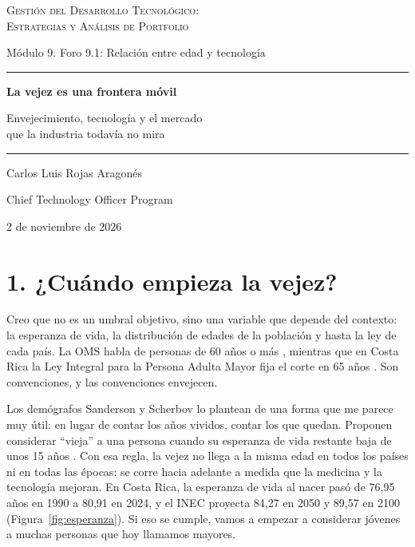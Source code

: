 \documentclass[11pt,letterpaper]{article}
\begin{document}
\begin{titlepage}
\centering
\vspace*{3.2cm}
{\large\scshape Gestión del Desarrollo Tecnológico:\\
Estrategias y Análisis de Portfolio\par}
\vspace{0.5cm}
{\normalsize Módulo 9. Foro 9.1: Relación entre edad y tecnología\par}
\vspace{2.6cm}
{\color{cEje}\rule{0.55\textwidth}{0.8pt}\par}
\vspace{0.7cm}
{\LARGE\bfseries La vejez es una frontera móvil\par}
\vspace{0.5cm}
{\large Envejecimiento, tecnología y el mercado\\
que la industria todavía no mira\par}
\vspace{0.7cm}
{\color{cEje}\rule{0.55\textwidth}{0.8pt}\par}
\vfill
{\large Carlos Luis Rojas Aragonés\par}
\vspace{0.3cm}
{\normalsize Chief Technology Officer Program\par}
\vspace{0.3cm}
{\normalsize 2 de noviembre de 2026\par}
\vspace*{1.5cm}
\end{titlepage}

\section*{1. ¿Cuándo empieza la vejez?}

Creo que no es un umbral objetivo, sino una variable que depende del contexto:
la esperanza de vida, la distribución de edades de la población y hasta la
ley de cada país. La OMS habla de personas de 60 años o más
\parencite{who2024}, mientras que en Costa Rica la Ley Integral para la Persona
Adulta Mayor fija el corte en 65 años \parencite{ley7935}. Son convenciones, y
las convenciones envejecen.

Los demógrafos Sanderson y Scherbov lo plantean de una forma que me parece muy
útil: en lugar de contar los años vividos, contar los que quedan. Proponen
considerar \enquote{vieja} a una persona cuando su esperanza de vida restante
baja de unos 15 años \parencite{sanderson2010}. Con esa regla, la vejez no
llega a la misma edad en todos los países ni en todas las épocas: se corre
hacia adelante a medida que la medicina y la tecnología mejoran. En Costa Rica,
la esperanza de vida al nacer pasó de 76,95 años en 1990 a 80,91 en 2024, y el
INEC proyecta 84,27 en 2050 y 89,57 en 2100 \parencite{ramirez2024}
(Figura~\ref{fig:esperanza}). Si eso se cumple, vamos a empezar a considerar
jóvenes a muchas personas que hoy llamamos mayores.
\end{document}
